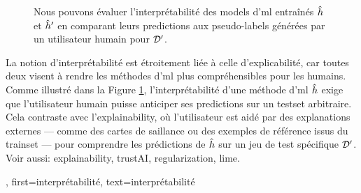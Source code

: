 {{\begin{figure}
\begin{center}
				\caption{Nous pouvons évaluer l’interprétabilité des \glspl{model} d'\gls{ml} entraînés 
					$\hat{h}$ et $\hat{h}'$ en comparant leurs \glspl{prediction} aux pseudo-\glspl{label} générées par un utilisateur humain pour $\mathcal{D}'$. 
					\label{fig_aug_simulatability_dict}}
			\end{center}
		\end{figure}
		La notion d’interprétabilité est étroitement liée à celle d’explicabilité,  
		car toutes deux visent à rendre les méthodes d'\gls{ml} plus compréhensibles pour les humains.  
		Comme illustré dans la Figure \ref{fig_aug_simulatability_dict}, l’interprétabilité d’une méthode d'\gls{ml}  
		$\hat{h}$ exige que l’utilisateur humain puisse anticiper ses \glspl{prediction}  
		sur un \gls{testset} arbitraire. Cela contraste avec l’\gls{explainability}, où l’utilisateur est aidé par  
		des \glspl{explanation} externes — comme des cartes de saillance ou des exemples de référence issus du \gls{trainset} —  
		pour comprendre les prédictions de $\hat{h}$ sur un jeu de test spécifique $\mathcal{D}'$. \\
		Voir aussi: \gls{explainability}, \gls{trustAI}, \gls{regularization}, \gls{lime}.},
	first={interprétabilité},
	text={interprétabilité}
}


